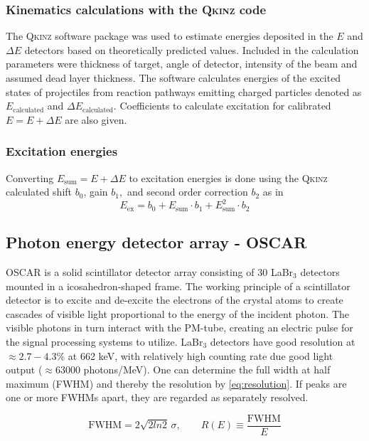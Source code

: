 \documentclass[a4paper,11pt]{article}
\begin{document}
\subsubsection{Kinematics calculations with the \textsc{Qkinz} code}
The \textsc{Qkinz} software package was used to estimate energies deposited in the $E$ and $\Delta E$ detectors based on theoretically predicted values\cite{MMarkova,qkinz}. Included in the calculation parameters were thickness of target, angle of detector, intensity of the beam and assumed dead layer thickness. The software calculates energies of the excited states of projectiles from reaction pathways emitting charged particles denoted as $E_\text{calculated}$ and $\Delta E_\text{calculated}$. Coefficients to calculate excitation for calibrated $E = E+\Delta E$ are also given. 

\subsubsection{Excitation energies}
Converting $E_\text{sum} = E + \Delta E$ to excitation energies is done using the \textsc{Qkinz} calculated shift $b_0$, gain $b_1,$ and second order correction $b_2$ as in 
\begin{equation}
    E_\text{ex} = b_0 +  E_\text{sum}\cdot b_1 +  E_\text{sum}^2 \cdot b_2 
\end{equation}

\subsection{Photon energy detector array - OSCAR}
OSCAR is a solid scintillator detector array consisting of 30 LaBr$_3$ detectors mounted in a icosahedron-shaped frame. The working principle of a scintillator detector is to excite and de-excite the electrons of the crystal atoms to create cascades of visible light proportional to the energy of the incident photon. The visible photons in turn interact with the PM-tube, creating an electric pulse for the signal processing systems to utilize. 
LaBr$_3$ detectors have good resolution at $\approx2.7-4.3\%$ at 662 keV, with relatively high counting rate due good light output ($\approx63000$ photons/MeV)\cite{MMarkova}. One can determine the full width at half maximum (FWHM) and thereby the resolution by \cref{eq:resolution}. If peaks are one or more FWHMs apart, they are regarded as separately resolved. 

\begin{equation}
\mathrm{FWHM} =2\sqrt{2ln2}\,\sigma, 
\qquad 
R(E) \equiv \frac{\mathrm{FWHM}}{E}
\label{eq:resolution}
\end{equation}
\end{document}
